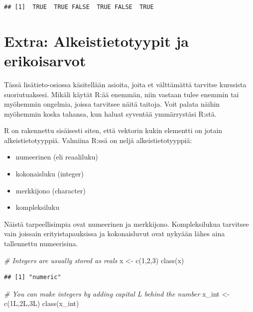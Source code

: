 \documentclass[
]{book}
\newenvironment{Shaded}{\begin{snugshade}}{\end{snugshade}}
\newcommand{\CommentTok}[1]{\textcolor[rgb]{0.56,0.35,0.01}{\textit{#1}}}
\newcommand{\DecValTok}[1]{\textcolor[rgb]{0.00,0.00,0.81}{#1}}
\newcommand{\FunctionTok}[1]{\textcolor[rgb]{0.00,0.00,0.00}{#1}}
\newcommand{\NormalTok}[1]{#1}
\newcommand{\OtherTok}[1]{\textcolor[rgb]{0.56,0.35,0.01}{#1}}
\providecommand{\tightlist}{%
  \setlength{\itemsep}{0pt}\setlength{\parskip}{0pt}}
\begin{document}
\begin{verbatim}
## [1]  TRUE  TRUE FALSE  TRUE FALSE  TRUE
\end{verbatim}

\hypertarget{extra}{%
\section{Extra: Alkeistietotyypit ja erikoisarvot}\label{extra}}

Tässä lisätieto-osiossa käsitellään asioita, joita et välttämättä tarvitse kurssista suoriutuaksesi. Mikäli käytät R:ää enemmän, niin vastaan tulee enemmin tai myöhemmin ongelmia, joissa tarvitsee näitä taitoja. Voit palata näihin myöhemmin koska tahansa, kun haluat syventää ymmärrystäsi R:stä.

R on rakennettu sisäisesti siten, että vektorin kukin elementti on jotain alkeistietotyyppiä. Valmiina R:ssä on neljä alkeistietotyyppiä:

\begin{itemize}
\tightlist
\item
  numeerinen (eli reaaliluku)
\item
  kokonaisluku (integer)
\item
  merkkijono (character)
\item
  kompleksiluku
\end{itemize}

Näistä tarpeellisimpia ovat numeerinen ja merkkijono. Kompleksilukua tarvitsee vain joissain erityistapauksissa ja kokonaisluvut ovat nykyään lähes aina tallennettu numeerisina.

\begin{Shaded}
\begin{Highlighting}[]
\CommentTok{\# Integers are usually stored as reals}
\NormalTok{x }\OtherTok{\textless{}{-}} \FunctionTok{c}\NormalTok{(}\DecValTok{1}\NormalTok{,}\DecValTok{2}\NormalTok{,}\DecValTok{3}\NormalTok{)}
\FunctionTok{class}\NormalTok{(x)}
\end{Highlighting}
\end{Shaded}

\begin{verbatim}
## [1] "numeric"
\end{verbatim}

\begin{Shaded}
\begin{Highlighting}[]
\CommentTok{\# You can make integers by adding capital L behind the number}
\NormalTok{x\_int }\OtherTok{\textless{}{-}} \FunctionTok{c}\NormalTok{(1L,2L,3L)}
\FunctionTok{class}\NormalTok{(x\_int)}
\end{Highlighting}
\end{Shaded}
\end{document}
